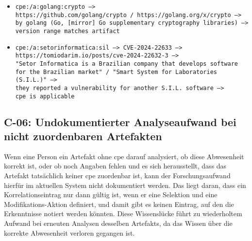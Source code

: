\begin{itemize}
    \itemsep0em
    \item \texttt{cpe:/a:golang:crypto\ -->\\https://github.com/golang/crypto / https://golang.org/x/crypto\ --> by golang (Go, [mirror] Go supplementary cryptography libraries)\ --> version range matches artifact}
    \item \texttt{cpe:/a:setorinformatica:sil\ --> CVE-2024-22633\ -->\\https://tomiodarim.io/posts/cve-2024-22632-3 -->\\"Setor Informatica is a Brazilian company that develops software for the Brazilian market" / "Smart System for Laboratories (S.I.L.)"\ -->\\they reported a vulnerability for another S.I.L. software -->\\cpe is applicable}
\end{itemize}

\subsection{C-06: Undokumentierter Analyseaufwand bei nicht zuordenbaren Artefakten}\label{subsec:c-06-falle-ohne-aktion-konnen-nicht-dokumentiert-werden}


Wenn eine Person ein Artefakt ohne \acrshort{cpe} darauf analysiert, ob diese Abwesenheit korrekt ist, oder ob noch Angaben fehlen und es sich herausstellt, dass das Artefakt tatsächlich keiner \acrshort{cpe} zuordenbar ist, kann der Forschungsaufwand hierfür im aktuellen System nicht dokumentiert werden.
Das liegt daran, dass ein Korrelationseintrag nur dann gültig ist, wenn er eine Selektion und eine Modifikations-Aktion definiert, und damit gibt es keinen Eintrag, auf den die Erkenntnisse notiert werden könnten.
Diese Wissenslücke führt zu wiederholtem Aufwand bei erneuten Analysen desselben Artefakts, da das Wissen über die korrekte Abwesenheit verloren gegangen ist.

